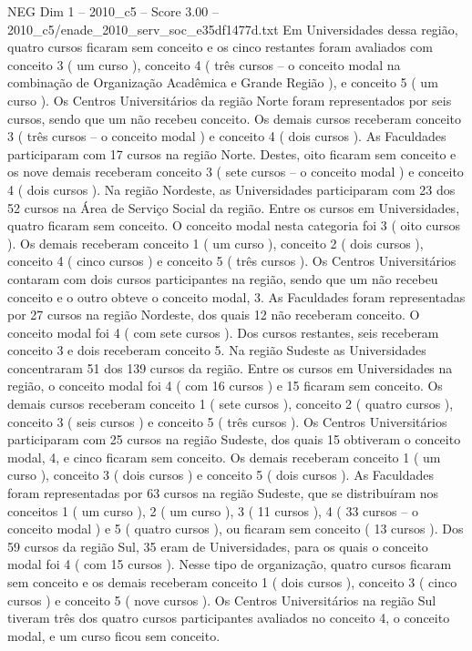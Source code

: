 \begin{textsample}{NEG Dim 1 – 2010\_c5 – Score 3.00 – 2010\_c5/enade\_2010\_serv\_soc\_e35df1477d.txt}
Em Universidades dessa região, quatro cursos ficaram sem conceito e os cinco restantes foram avaliados com conceito 3 ( um curso ), conceito 4 ( três cursos – o conceito modal na combinação de Organização Acadêmica e Grande Região ), e conceito 5 ( um curso ).
Os Centros Universitários da região Norte foram representados por seis cursos, sendo que um não recebeu conceito.
Os demais cursos receberam conceito 3 ( três cursos – o conceito modal ) e conceito 4 ( dois cursos ).
As Faculdades participaram com 17 cursos na região Norte.
Destes, oito ficaram sem conceito e os nove demais receberam conceito 3 ( sete cursos – o conceito modal ) e conceito 4 ( dois cursos ).
Na região Nordeste, as Universidades participaram com 23 dos 52 cursos na Área de Serviço Social da região.
Entre os cursos em Universidades, quatro ficaram sem conceito.
O conceito modal nesta categoria foi 3 ( oito cursos ).
Os demais receberam conceito 1 ( um curso ), conceito 2 ( dois cursos ), conceito 4 ( cinco cursos ) e conceito 5 ( três cursos ).
Os Centros Universitários contaram com dois cursos participantes na região, sendo que um não recebeu conceito e o outro obteve o conceito modal, 3.
As Faculdades foram representadas por 27 cursos na região Nordeste, dos quais 12 não receberam conceito.
O conceito modal foi 4 ( com sete cursos ).
Dos cursos restantes, seis receberam conceito 3 e dois receberam conceito 5.
Na região Sudeste as Universidades concentraram 51 dos 139 cursos da região.
Entre os cursos em Universidades na região, o conceito modal foi 4 ( com 16 cursos ) e 15 ficaram sem conceito.
Os demais cursos receberam conceito 1 ( sete cursos ), conceito 2 ( quatro cursos ), conceito 3 ( seis cursos ) e conceito 5 ( três cursos ).
Os Centros Universitários participaram com 25 cursos na região Sudeste, dos quais 15 obtiveram o conceito modal, 4, e cinco ficaram sem conceito.
Os demais receberam conceito 1 ( um curso ), conceito 3 ( dois cursos ) e conceito 5 ( dois cursos ).
As Faculdades foram representadas por 63 cursos na região Sudeste, que se distribuíram nos conceitos 1 ( um curso ), 2 ( um curso ), 3 ( 11 cursos ), 4 ( 33 cursos – o conceito modal ) e 5 ( quatro cursos ), ou ficaram sem conceito ( 13 cursos ).
Dos 59 cursos da região Sul, 35 eram de Universidades, para os quais o conceito modal foi 4 ( com 15 cursos ).
Nesse tipo de organização, quatro cursos ficaram sem conceito e os demais receberam conceito 1 ( dois cursos ), conceito 3 ( cinco cursos ) e conceito 5 ( nove cursos ).
Os Centros Universitários na região Sul tiveram três dos quatro cursos participantes avaliados no conceito 4, o conceito modal, e um curso ficou sem conceito.

\end{textsample}
